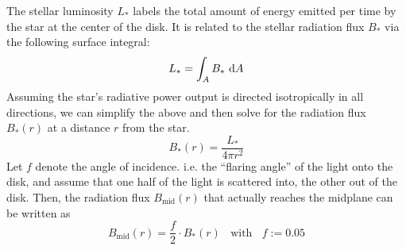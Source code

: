 


    The stellar luminosity $L_*$ labels the total amount of energy emitted per time by the star at 
    the center of the disk. It is related to the stellar radiation flux $B_*$ via the following 
    surface integral:
    \begin{equation}
        L_* = \int_A B_*\ \text d A
    \end{equation}
    Assuming the star's radiative power output is directed isotropically in all directions,
    we can simplify the above and then solve for the radiation flux $B_*(r)$ at 
    a distance $r$ from the star.
    \begin{equation}
        B_*(r) = \frac{L_*}{4\pi r^2}
    \end{equation}
    Let $f$ denote the angle of incidence. i.e. the ``flaring angle'' of the light onto the disk, and
    assume that one half of the light is scattered into, the other out of the disk. Then, the
    radiation flux $B_\text{mid}(r)$ that actually reaches the midplane can be written as
    \begin{equation}
        B_\text{mid}(r) = \frac{f}{2} \cdot B_*(r)
        \ \ \ \ \text{with}\ \ \ \
        f := 0.05
    \end{equation}
